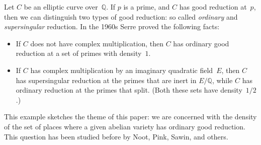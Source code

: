 \documentclass{amsart}
\begin{document}
Let $C$ be an elliptic curve over~$\mathbb{Q}$.
If $p$ is a prime, and $C$ has good reduction at~$p$,
then we can distinguish two types of good reduction:
so called \emph{ordinary} and \emph{supersingular} reduction.
In the 1960s %
Serre proved the following facts:
\begin{itemize}
 \item If $C$ does not have complex multiplication,
  then $C$ has ordinary good reduction at
  a set of primes with density~$1$.
 \item If $C$ has complex multiplication by an
  imaginary quadratic field~$E$,
  then $C$ has supersingular reduction
  at the primes that are inert in $E/\mathbb{Q}$,
  while $C$ has ordinary reduction at the primes that split.
  (Both these sets have density~$1/2$.)
\end{itemize}
This example sketches the theme of this paper:
we are concerned with the density of the set of places
where a given abelian variety has ordinary good reduction.
This question has been studied before by
Noot, Pink, Sawin, and others.

\printbibliography
\end{document}
